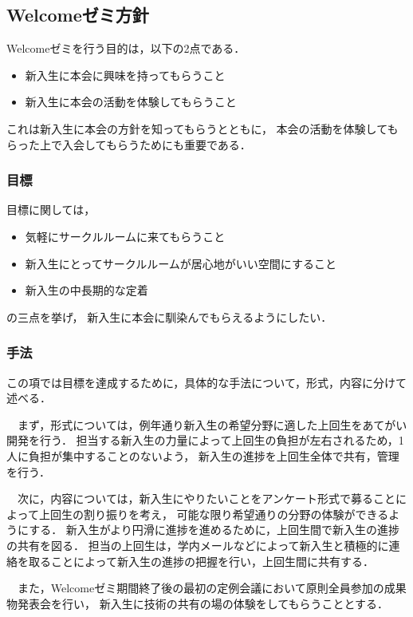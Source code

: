 \subsection*{Welcomeゼミ方針}


Welcomeゼミを行う目的は，以下の2点である．

\begin{itemize}
    \item 新入生に本会に興味を持ってもらうこと
    \item 新入生に本会の活動を体験してもらうこと
\end{itemize}
これは新入生に本会の方針を知ってもらうとともに，
本会の活動を体験してもらった上で入会してもらうためにも重要である．

\subsubsection*{目標}
目標に関しては，
\begin{itemize}
    \item 気軽にサークルルームに来てもらうこと
    \item 新入生にとってサークルルームが居心地がいい空間にすること
    \item 新入生の中長期的な定着
\end{itemize}
の三点を挙げ，
新入生に本会に馴染んでもらえるようにしたい．

\subsubsection*{手法}
この項では目標を達成するために，具体的な手法について，形式，内容に分けて述べる．

　まず，形式については，例年通り新入生の希望分野に適した上回生をあてがい開発を行う．
担当する新入生の力量によって上回生の負担が左右されるため，1人に負担が集中することのないよう，
新入生の進捗を上回生全体で共有，管理を行う．

　次に，内容については，新入生にやりたいことをアンケート形式で募ることによって上回生の割り振りを考え，
可能な限り希望通りの分野の体験ができるようにする．
新入生がより円滑に進捗を進めるために，上回生間で新入生の進捗の共有を図る．
担当の上回生は，学内メールなどによって新入生と積極的に連絡を取ることによって新入生の進捗の把握を行い，上回生間に共有する．

　また，Welcomeゼミ期間終了後の最初の定例会議において原則全員参加の成果物発表会を行い，
新入生に技術の共有の場の体験をしてもらうこととする．

